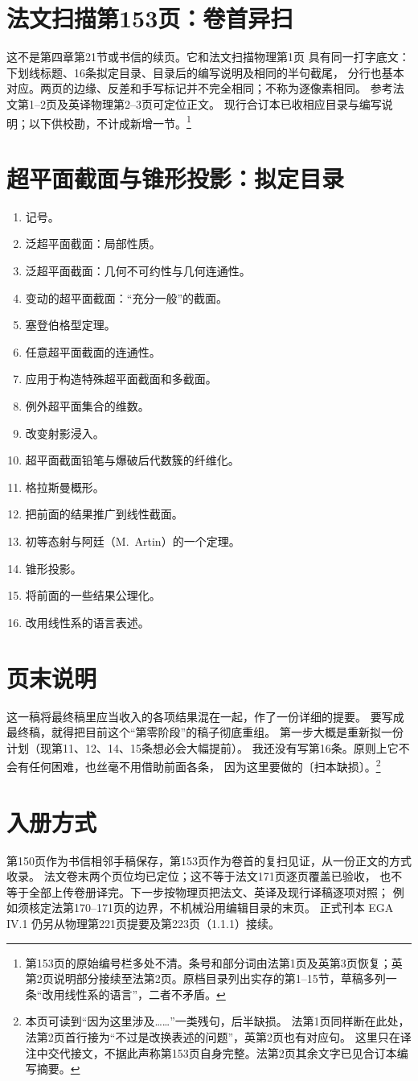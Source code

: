 \documentclass[openany,fontset=fandol]{ctexbook}
\newcommand{\gap}{〔扫本缺损〕}
\begin{document}
\section*{法文扫描第153页：卷首异扫}

这不是第四章第21节或书信的续页。它和法文扫描物理第1页
具有同一打字底文：下划线标题、16条拟定目录、目录后的编写说明及相同的半句截尾，
分行也基本对应。两页的边缘、反差和手写标记并不完全相同；不称为逐像素相同。
参考法文第1--2页及英译物理第2--3页可定位正文。
现行合订本已收相应目录与编写说明；以下供校勘，不计成新增一节。\footnote{第153页的原始编号栏多处不清。条号和部分词由法第1页及英第3页恢复；英第2页说明部分接续至法第2页。原档目录列出实存的第1--15节，草稿多列一条“改用线性系的语言”，二者不矛盾。}

\section*{超平面截面与锥形投影：拟定目录}
\begin{enumerate}
 \item 记号。
 \item 泛超平面截面：局部性质。
 \item 泛超平面截面：几何不可约性与几何连通性。
 \item 变动的超平面截面：“充分一般”的截面。
 \item 塞登伯格型定理。
 \item 任意超平面截面的连通性。
 \item 应用于构造特殊超平面截面和多截面。
 \item 例外超平面集合的维数。
 \item 改变射影浸入。
 \item 超平面截面铅笔与爆破后代数簇的纤维化。
 \item 格拉斯曼概形。
 \item 把前面的结果推广到线性截面。
 \item 初等态射与阿廷（M.~Artin）的一个定理。
 \item 锥形投影。
 \item 将前面的一些结果公理化。
 \item 改用线性系的语言表述。
\end{enumerate}

\section*{页末说明}
这一稿将最终稿里应当收入的各项结果混在一起，作了一份详细的提要。
要写成最终稿，就得把目前这个“第零阶段”的稿子彻底重组。
第一步大概是重新拟一份计划（现第11、12、14、15条想必会大幅提前）。
我还没有写第16条。原则上它不会有任何困难，也丝毫不用借助前面各条，
因为这里要做的\gap。\footnote{本页可读到“因为这里涉及……”一类残句，后半缺损。
法第1页同样断在此处，法第2页首行接为“不过是改换表述的问题”，英第2页也有对应句。
这里只在译注中交代接文，不据此声称第153页自身完整。法第2页其余文字已见合订本编写摘要。}

\section*{入册方式}
第150页作为书信相邻手稿保存，第153页作为卷首的复扫见证，从一份正文的方式收录。
法文卷末两个页位均已定位；这不等于法文171页逐页覆盖已验收，
也不等于全部上传卷册译完。下一步按物理页把法文、英译及现行译稿逐项对照；
例如须核定法第170--171页的边界，不机械沿用编辑目录的末页。
正式刊本 EGA IV.1 仍另从物理第221页提要及第223页（1.1.1）接续。
\end{document}
